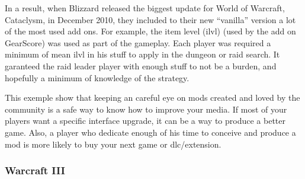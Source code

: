 \documentclass[a4paper,11pt]{article}
\begin{document}
In a result, when Blizzard released the biggest update for World of Warcraft, Cataclysm, in   December 2010, they included to their new “vanilla” version a lot of the most used add ons. For example, the item level (ilvl)  (used by the add on GearScore) was used as part of the gameplay. Each player was required a minimum of mean ilvl in his stuff to apply in the dungeon or raid search. It garanteed the raid leader player with enough stuff to not be a burden, and hopefully a minimum of knowledge of the strategy.

This exemple show that keeping an careful eye on mods created and loved by the community is a safe way to know how to improve your media. If most of your players want a specific interface upgrade, it can be a way to produce a better game. Also, a player who dedicate enough of his time to conceive and produce a mod is more likely to buy your next game or dlc/extension.

\subsubsection{Warcraft III}
\end{document}
